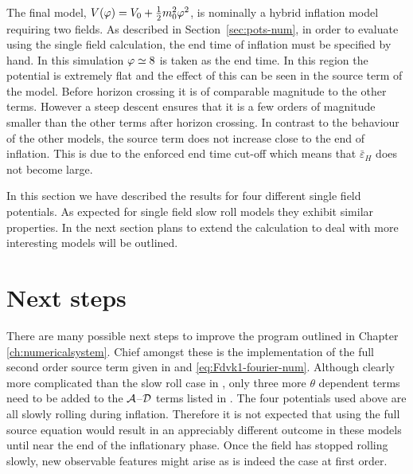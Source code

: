 The final model, $V(\varphi)=V_0 + \frac{1}{2} m_0^2 \varphi^2$, is nominally a hybrid inflation model
requiring two fields.
As described in Section~\ref{sec:pots-num}, in order to evaluate using the single field
calculation, the end time of inflation must be specified by hand. In this simulation
$\varphi\simeq 8$
is taken as the end time. In this region the potential is extremely flat and the effect of this can
be seen in the source term of the model. Before horizon crossing it is of comparable magnitude to
the other terms. However a steep descent ensures that it is a few orders of magnitude
smaller than
the other terms after horizon crossing. In contrast to the behaviour of the other models, the source
term does not increase close to the end of inflation. This is due to the enforced end time cut-off
which means that $\bar{\varepsilon}_H$ does not become large.

In this section we have described the results for four different single field potentials. As
expected for single field slow roll models they exhibit similar properties. In the next section
plans to extend the calculation to deal with more interesting models will be outlined.

\section{Next steps}
\label{sec:next-res}

There are many possible next steps to improve the program outlined in
Chapter \ref{ch:numericalsystem}. Chief amongst these is the implementation of the
full second order source term given in  and
\eqref{eq:Fdvk1-fourier-num}. Although clearly
more complicated than the slow roll case in ,
only three more $\theta$ dependent terms need to be added to the $\mathcal{A}$--$\mathcal{D}$ terms
listed in .  The four potentials used above are all slowly rolling
during inflation. Therefore it is not expected that
using the full source equation would result in an appreciably
different outcome in these models until near the end of the inflationary phase. Once
the field has stopped rolling slowly, new observable features might
arise as is indeed the case at first order. 


